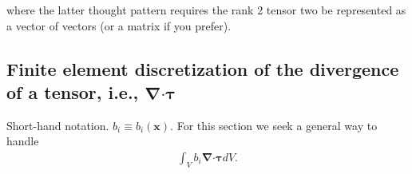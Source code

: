 \documentclass[10pt,letterpaper,notitlepage]{article}
\numberwithin{equation}{section}
\newcommand{\bnabla}{\boldsymbol{\nabla}}
\newcommand{\position}{\mathbf{x}}
\newcommand{\dotp}{\boldsymbol{\cdot}}
\newcommand{\beqn}{\begin{equation}\begin{aligned}}
\newcommand{\eeqn}{\end{aligned}\end{equation}}
\begin{document}
\begin{appendices}
where the latter thought pattern requires the rank 2 tensor two be represented as a vector of vectors (or a matrix if you prefer).
\newline
\newline
\subsection{Finite element discretization of the divergence of a tensor, i.e., $\bnabla \dotp \boldsymbol{\tau}$}
Short-hand notation. $b_i \equiv b_i(\position)$. For this section we seek a general way to handle
\beqn 
\int_V b_i \bnabla \dotp \boldsymbol{\tau} dV.
\eeqn


\end{appendices}
\end{document}
